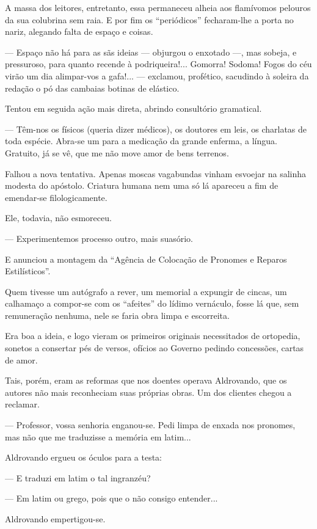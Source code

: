 A massa dos leitores, entretanto, essa permaneceu alheia aos flamívomos
pelouros da sua colubrina sem raia. E por fim os ``periódicos''
fecharam-lhe a porta no nariz, alegando falta de espaço e coisas.

--- Espaço não há para as sãs ideias --- objurgou o enxotado ---, mas
sobeja, e pressuroso, para quanto recende à podriqueira!... Gomorra!
Sodoma! Fogos do céu virão um dia alimpar-vos a gafa!... --- exclamou,
profético, sacudindo à soleira da redação o pó das cambaias botinas de
elástico.

Tentou em seguida ação mais direta, abrindo consultório gramatical.

--- Têm-nos os físicos (queria dizer médicos), os doutores em leis, os
charlatas de toda espécie. Abra-se um para a medicação da grande
enferma, a língua. Gratuito, já se vê, que me não move amor de bens
terrenos.

Falhou a nova tentativa. Apenas moscas vagabundas vinham esvoejar na
salinha modesta do apóstolo. Criatura humana nem uma só lá apareceu a
fim de emendar-se filologicamente.

Ele, todavia, não esmoreceu.

--- Experimentemos processo outro, mais suasório.

E anunciou a montagem da ``Agência de Colocação de Pronomes e Reparos
Estilísticos''.

Quem tivesse um autógrafo a rever, um memorial a expungir de cincas, um
calhamaço a compor-se com os ``afeites'' do lídimo vernáculo, fosse lá
que, sem remuneração nenhuma, nele se faria obra limpa e escorreita.

Era boa a ideia, e logo vieram os primeiros originais necessitados de
ortopedia, sonetos a consertar pés de versos, ofícios ao Governo pedindo
concessões, cartas de amor.

Tais, porém, eram as reformas que nos doentes operava Aldrovando, que os
autores não mais reconheciam suas próprias obras. Um dos clientes chegou
a reclamar.

--- Professor, vossa senhoria enganou-se. Pedi limpa de enxada nos
pronomes, mas não que me traduzisse a memória em latim...

Aldrovando ergueu os óculos para a testa:

--- E traduzi em latim o tal ingranzéu?

--- Em latim ou grego, pois que o não consigo entender...

Aldrovando empertigou-se.

